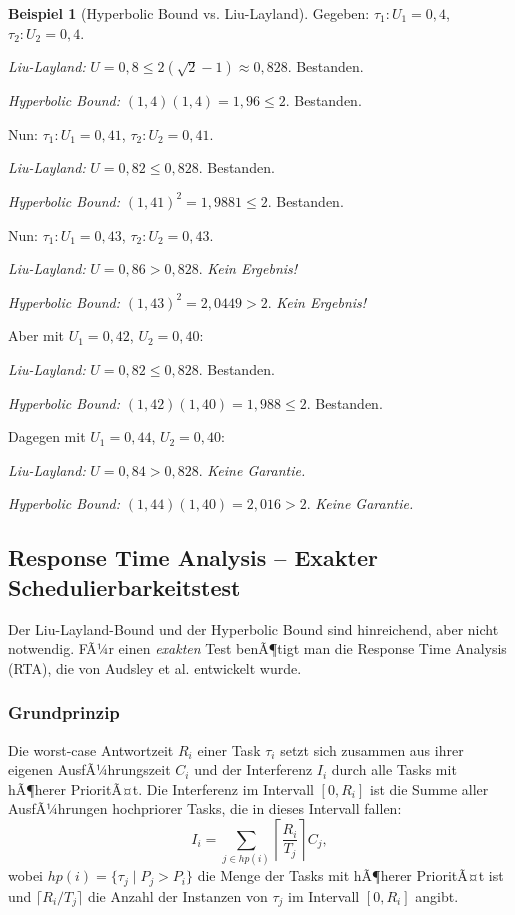 ﻿\documentclass[a4paper,12pt]{report}
\theoremstyle{definition}
\newtheorem{beispiel}{Beispiel}[chapter]
\begin{document}
\begin{beispiel}[Hyperbolic Bound vs. Liu-Layland]
	Gegeben: $\tau_1: U_1 = 0{,}4$, $\tau_2: U_2 = 0{,}4$.

	\textit{Liu-Layland:} $U = 0{,}8 \leq 2(\sqrt{2}-1) \approx 0{,}828$. Bestanden.

	\textit{Hyperbolic Bound:} $(1{,}4)(1{,}4) = 1{,}96 \leq 2$. Bestanden.

	Nun: $\tau_1: U_1 = 0{,}41$, $\tau_2: U_2 = 0{,}41$.

	\textit{Liu-Layland:} $U = 0{,}82 \leq 0{,}828$. Bestanden.

	\textit{Hyperbolic Bound:} $(1{,}41)^2 = 1{,}9881 \leq 2$. Bestanden.

	Nun: $\tau_1: U_1 = 0{,}43$, $\tau_2: U_2 = 0{,}43$.

	\textit{Liu-Layland:} $U = 0{,}86 > 0{,}828$. \emph{Kein Ergebnis!}

	\textit{Hyperbolic Bound:} $(1{,}43)^2 = 2{,}0449 > 2$. \emph{Kein Ergebnis!}

	Aber mit $U_1 = 0{,}42$, $U_2 = 0{,}40$:

	\textit{Liu-Layland:} $U = 0{,}82 \leq 0{,}828$. Bestanden.

	\textit{Hyperbolic Bound:} $(1{,}42)(1{,}40) = 1{,}988 \leq 2$. Bestanden.

	Dagegen mit $U_1 = 0{,}44$, $U_2 = 0{,}40$:

	\textit{Liu-Layland:} $U = 0{,}84 > 0{,}828$. \emph{Keine Garantie.}

	\textit{Hyperbolic Bound:} $(1{,}44)(1{,}40) = 2{,}016 > 2$. \emph{Keine Garantie.}
\end{beispiel}

\subsection{Response Time Analysis -- Exakter Schedulierbarkeitstest}
\label{sec:rta}

Der Liu-Layland-Bound und der Hyperbolic Bound sind hinreichend, aber nicht
notwendig. FÃ¼r einen \emph{exakten} Test benÃ¶tigt man die Response Time Analysis
(RTA), die von Audsley et al. \cite{Audsley1993} entwickelt wurde.

\subsubsection{Grundprinzip}

Die worst-case Antwortzeit $R_i$ einer Task $\tau_i$ setzt sich zusammen aus ihrer
eigenen AusfÃ¼hrungszeit $C_i$ und der Interferenz $I_i$ durch alle Tasks mit hÃ¶herer
PrioritÃ¤t. Die Interferenz im Intervall $[0, R_i]$ ist die Summe aller AusfÃ¼hrungen
hochpriorer Tasks, die in dieses Intervall fallen:
\[
	I_i = \sum_{j \in hp(i)} \left\lceil \frac{R_i}{T_j} \right\rceil C_j,
\]
wobei $hp(i) = \{\tau_j \mid P_j > P_i\}$ die Menge der Tasks mit hÃ¶herer PrioritÃ¤t
ist und $\lceil R_i/T_j \rceil$ die Anzahl der Instanzen von $\tau_j$ im Intervall
$[0, R_i]$ angibt.
\end{document}
